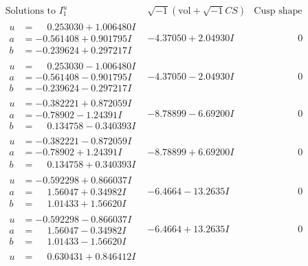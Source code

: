 \documentclass[1p]{elsarticle_modified}
\theoremstyle{definition}
\newcommand{\I}{\sqrt{-1}}
\begin{document}
$$\begin{array}{c|c|c}  
\text{Solutions to }I^u_{1}& \I (\text{vol} + \sqrt{-1}CS) & \text{Cusp shape}\\
 \hline 
\begin{aligned}
u &= \phantom{-}0.253030 + 1.006480 I \\
a &= -0.561408 + 0.901795 I \\
b &= -0.239624 + 0.297217 I\end{aligned}
 & -4.37050 + 2.04930 I & \phantom{-0.000000 } 0 \\ \hline\begin{aligned}
u &= \phantom{-}0.253030 - 1.006480 I \\
a &= -0.561408 - 0.901795 I \\
b &= -0.239624 - 0.297217 I\end{aligned}
 & -4.37050 - 2.04930 I & \phantom{-0.000000 } 0 \\ \hline\begin{aligned}
u &= -0.382221 + 0.872059 I \\
a &= -0.78902 - 1.24391 I \\
b &= \phantom{-}0.134758 - 0.340393 I\end{aligned}
 & -8.78899 - 6.69200 I & \phantom{-0.000000 } 0 \\ \hline\begin{aligned}
u &= -0.382221 - 0.872059 I \\
a &= -0.78902 + 1.24391 I \\
b &= \phantom{-}0.134758 + 0.340393 I\end{aligned}
 & -8.78899 + 6.69200 I & \phantom{-0.000000 } 0 \\ \hline\begin{aligned}
u &= -0.592298 + 0.866037 I \\
a &= \phantom{-}1.56047 + 0.34982 I \\
b &= \phantom{-}1.01433 + 1.56620 I\end{aligned}
 & -6.4664 - 13.2635 I & \phantom{-0.000000 } 0 \\ \hline\begin{aligned}
u &= -0.592298 - 0.866037 I \\
a &= \phantom{-}1.56047 - 0.34982 I \\
b &= \phantom{-}1.01433 - 1.56620 I\end{aligned}
 & -6.4664 + 13.2635 I & \phantom{-0.000000 } 0 \\ \hline\begin{aligned}
u &= \phantom{-}0.630431 + 0.846412 I \\

\end{aligned}
\end{array}$$
\end{document}
